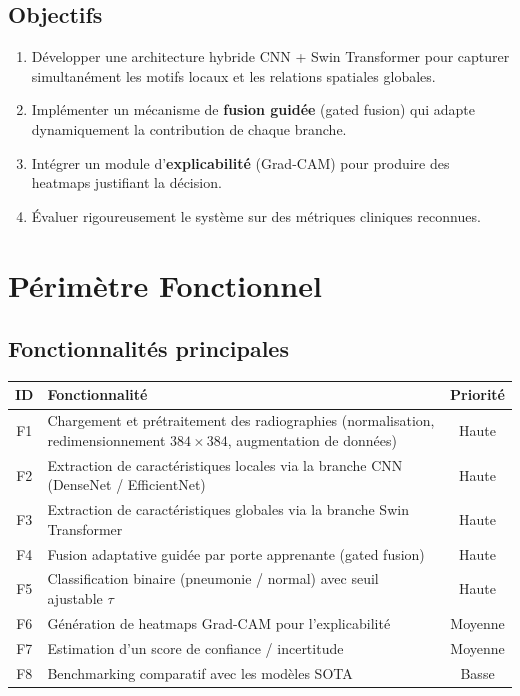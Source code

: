 \documentclass[a4paper,12pt]{article}
\begin{document}
\subsection{Objectifs}

\begin{enumerate}[leftmargin=1.5em, itemsep=3pt]
  \item Développer une architecture hybride CNN + Swin Transformer pour capturer simultanément les motifs locaux et les relations spatiales globales.
  \item Implémenter un mécanisme de \textbf{fusion guidée} (gated fusion) qui adapte dynamiquement la contribution de chaque branche.
  \item Intégrer un module d'\textbf{explicabilité} (Grad-CAM) pour produire des heatmaps justifiant la décision.
  \item Évaluer rigoureusement le système sur des métriques cliniques reconnues.
\end{enumerate}

\newpage
\section{Périmètre Fonctionnel}

\subsection{Fonctionnalités principales}

\renewcommand{\arraystretch}{1.35}
\begin{tabularx}{\linewidth}{@{}c X c@{}}
  \toprule
  \textbf{ID} & \textbf{Fonctionnalité} & \textbf{Priorité} \\
  \midrule
  F1 & Chargement et prétraitement des radiographies (normalisation, redimensionnement $384\times384$, augmentation de données) & Haute \\
  \rowcolor{grisClair}
  F2 & Extraction de caractéristiques locales via la branche CNN (DenseNet / EfficientNet) & Haute \\
  F3 & Extraction de caractéristiques globales via la branche Swin Transformer & Haute \\
  \rowcolor{grisClair}
  F4 & Fusion adaptative guidée par porte apprenante (gated fusion) & Haute \\
  F5 & Classification binaire (pneumonie / normal) avec seuil ajustable $\tau$ & Haute \\
  \rowcolor{grisClair}
  F6 & Génération de heatmaps Grad-CAM pour l'explicabilité & Moyenne \\
  F7 & Estimation d'un score de confiance / incertitude & Moyenne \\
  \rowcolor{grisClair}
  F8 & Benchmarking comparatif avec les modèles SOTA & Basse \\
  \bottomrule
\end{tabularx}
\end{document}
